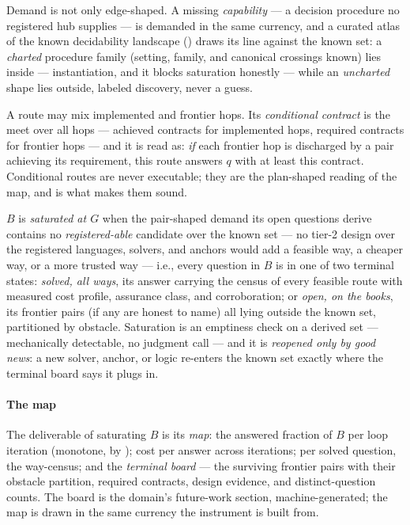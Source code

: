 Demand is not only edge-shaped. A missing \emph{capability} --- a
decision procedure no registered hub supplies --- is demanded in the
same currency, and a curated atlas of the known decidability
landscape () draws its line against the known set: a
\emph{charted} procedure family (setting, family, and canonical
crossings known) lies inside --- instantiation, and it blocks
saturation honestly --- while an \emph{uncharted} shape lies outside,
labeled discovery, never a guess.

\begin{definition}
\label{def:conditional}
A route may mix implemented and frontier hops. Its \emph{conditional
contract} is the meet over all hops --- achieved contracts for
implemented hops, required contracts for frontier hops --- and it is
read as: \emph{if} each frontier hop is discharged by a pair
achieving its requirement, this route answers $q$ with at least this
contract. Conditional routes are never executable; they are the
plan-shaped reading of the map, and  is what makes
them sound.
\end{definition}

\begin{definition}[Saturation]
\label{def:saturation}
$B$ is \emph{saturated at $G$} when the pair-shaped demand its open
questions derive contains no \emph{registered-able} candidate over
the known set --- no tier-2 design over the registered languages,
solvers, and anchors would add a feasible way, a cheaper way, or a
more trusted way --- i.e., every question in $B$ is in one of two
terminal states: \emph{solved, all ways}, its answer carrying the
census of every feasible route with measured cost profile, assurance
class, and corroboration; or \emph{open, on the books}, its frontier
pairs (if any are honest to name) all lying outside the known set,
partitioned by obstacle. Saturation is an emptiness check on a
derived set --- mechanically detectable, no judgment call --- and it
is \emph{reopened only by good news}: a new solver, anchor, or logic
re-enters the known set exactly where the terminal board says it
plugs in.
\end{definition}

\paragraph{The map}
The deliverable of saturating $B$ is its \emph{map}: the answered
fraction of $B$ per loop iteration (monotone, by
); cost per answer across iterations; per solved
question, the way-census; and the \emph{terminal board} --- the
surviving frontier pairs with their obstacle partition, required
contracts, design evidence, and distinct-question counts. The board
is the domain's future-work section, machine-generated; the map is
drawn in the same currency the instrument is built from.
